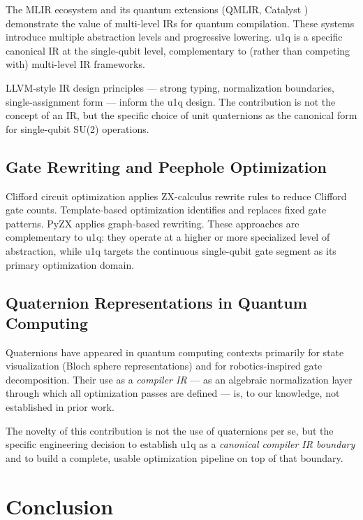 \documentclass[conference]{IEEEtran}
\begin{document}
The MLIR \cite{b4} ecosystem and its quantum extensions (QMLIR, Catalyst \cite{b5})
demonstrate the value of multi-level IRs for quantum compilation. These systems introduce
multiple abstraction levels and progressive lowering. u1q is a specific canonical IR at the
single-qubit level, complementary to (rather than competing with) multi-level IR frameworks.

LLVM-style IR design principles --- strong typing, normalization boundaries, single-assignment
form --- inform the u1q design. The contribution is not the concept of an IR, but the specific
choice of unit quaternions as the canonical form for single-qubit SU(2) operations.

\subsection{Gate Rewriting and Peephole Optimization}

Clifford circuit optimization \cite{b6,b7} applies ZX-calculus rewrite rules to reduce
Clifford gate counts. Template-based optimization \cite{b8} identifies and replaces fixed gate
patterns. PyZX \cite{b9} applies graph-based rewriting. These approaches are complementary to
u1q: they operate at a higher or more specialized level of abstraction, while u1q targets the
continuous single-qubit gate segment as its primary optimization domain.

\subsection{Quaternion Representations in Quantum Computing}

Quaternions have appeared in quantum computing contexts primarily for state visualization
(Bloch sphere representations) and for robotics-inspired gate decomposition. Their use as a
\textit{compiler IR} --- as an algebraic normalization layer through which all optimization
passes are defined --- is, to our knowledge, not established in prior work.

The novelty of this contribution is not the use of quaternions per se, but the specific
engineering decision to establish u1q as a \textit{canonical compiler IR boundary} and to
build a complete, usable optimization pipeline on top of that boundary.

\section{Conclusion}
\end{document}
